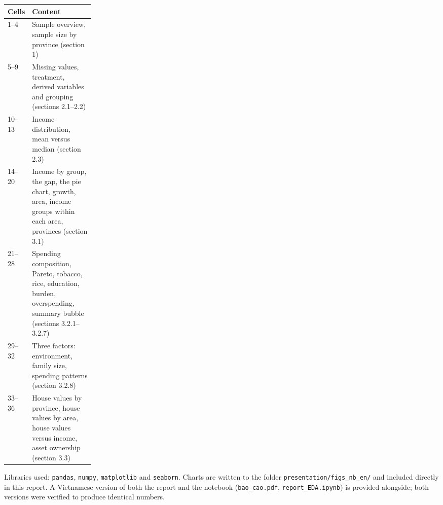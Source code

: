\documentclass[11pt,a4paper]{article}
\begin{document}
\begin{center}\small
\begin{tabularx}{\linewidth}{@{}p{0.2\linewidth}X@{}}
\toprule
\textbf{Cells} & \textbf{Content}\\
\midrule
1–4 & Sample overview, sample size by province (section 1)\\
5–9 & Missing values, treatment, derived variables and grouping (sections 2.1–2.2)\\
10–13 & Income distribution, mean versus median (section 2.3)\\
14–20 & Income by group, the gap, the pie chart, growth, area, income groups within each area, provinces (section 3.1)\\
21–28 & Spending composition, Pareto, tobacco, rice, education, burden, overspending, summary bubble (sections 3.2.1–3.2.7)\\
29–32 & Three factors: environment, family size, spending patterns (section 3.2.8)\\
33–36 & House values by province, house values by area, house values versus income, asset ownership (section 3.3)\\
\bottomrule
\end{tabularx}
\end{center}

Libraries used: \texttt{pandas}, \texttt{numpy}, \texttt{matplotlib} and \texttt{seaborn}. Charts are written to the folder \texttt{presentation/figs\_nb\_en/} and included directly in this report. A Vietnamese version of both the report and the notebook (\texttt{bao\_cao.pdf}, \texttt{report\_EDA.ipynb}) is provided alongside; both versions were verified to produce identical numbers.
\end{document}
